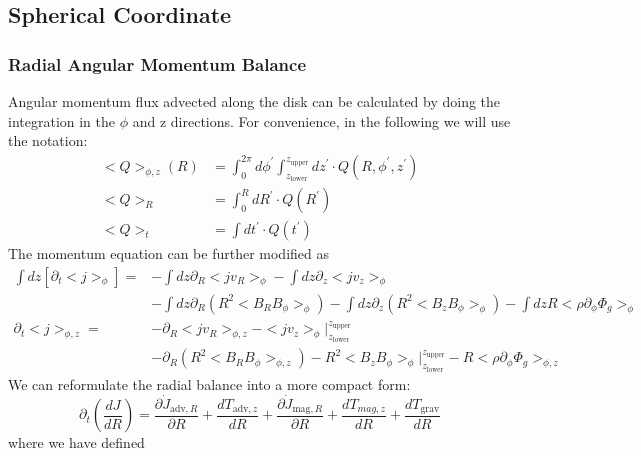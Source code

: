 \documentclass{article}
\newcommand{\hyw}[1]{{\color{red}{[{#1}]}}}
\begin{document}
\subsection{Spherical Coordinate}

\subsubsection{Radial Angular Momentum Balance}


Angular momentum flux advected along the disk can be calculated by doing the integration in the $\phi$ and z directions. For convenience, in the following we will use the notation:
\begin{align*}
\displaystyle < Q >_{\phi ,z}( R) &=\int _{0}^{2\pi } d\phi^\prime \int _{z_{\mathrm{lower}}}^{z_{\mathrm{upper}}} dz^\prime\cdot Q( R,\phi^\prime ,z^\prime) \\
< Q >_{R} &=\int_{0}^{R} dR^\prime\cdot Q(R^\prime) \\
< Q >_{t} &=\int dt^\prime\cdot Q(t^\prime)
\end{align*}
The momentum equation can be further modified as
\begin{align*}
\int dz[ \partial _{t}< j> _{\phi }]  = &-\int dz\partial _{R}< jv_{R}> _{\phi } -\int dz\partial _{z}< jv_{z}> _{\phi } \\
&-\int dz\partial _{R}\left( R^{2}< B_{R} B_{\phi }> _{\phi }\right) -\int dz\partial _{z}\left( R^{2}< B_{z} B_{\phi }> _{\phi }\right) -\int dzR< \rho \partial _{\phi } \Phi _{g}> _{\phi }\\
\partial _{t}< j> _{\phi ,z}  = &-\partial _{R}< jv_{R}> _{\phi ,z} -< jv_{z}> _{\phi } |_{z_{\mathrm{lower}}}^{z_{\mathrm{upper}}} \\
&-\partial _{R}\left( R^{2}< B_{R} B_{\phi }> _{\phi ,z}\right) -R^{2}< B_{z} B_{\phi }> _{\phi } |_{z_{\mathrm{lower}}}^{z_{\mathrm{upper}}} -R< \rho \partial _{\phi } \Phi _{g}> _{\phi ,z}
\end{align*}
We can reformulate the radial balance into a more compact form: 
\begin{equation*}
\partial _{t}\left(\frac{dJ}{dR}\right) =\frac{\partial \dot{J}_{\mathrm{adv} ,R}}{\partial R} +\frac{dT_{\mathrm{adv} ,z}}{dR} +\frac{\partial \dot{J}_{\mathrm{mag} ,R}}{\partial R} +\frac{dT_{mag,z}}{dR} +\frac{dT_{\mathrm{grav}}}{dR}
\end{equation*}
where we have defined 
\end{document}
